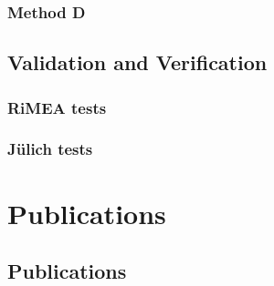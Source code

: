 \documentclass[%
paper=A4,					%
twoside=true,				%
openright,					%
parskip=full,				%
chapterprefix=true,			%
11pt,						%
headings=normal,			%
bibliography=totoc,			%
listof=totoc,				%
titlepage=on,				%
captions=tableabove,		%
draft=false,				%
]{scrreprt}%
\begin{document}
\subsection{Method D}

\newpage
\section{Validation and Verification}
\subsection{RiMEA tests}

\newpage
\subsection{J\"ulich tests}



\chapter{Publications}
\section{Publications}
\label{sec:label}

% 

\end{document}
